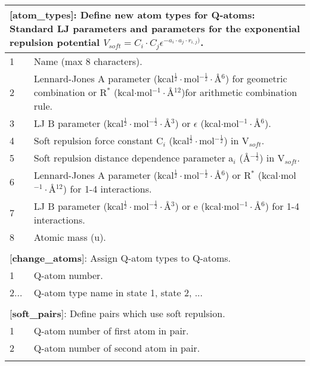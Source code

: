 \documentclass[a4paper,11pt]{article}
\begin{document}
\begin{longtable}{|p{53pt}|p{181pt}|p{160pt}|}
\multicolumn{3}{p{394pt}}{[\textbf{atom\_types}]: Define new atom types for Q-atoms: Standard LJ parameters and parameters for the exponential repulsion potential $V_{soft} = C_i\cdot C_j\epsilon^{-a_i\cdot a_j\cdot r_{i,j})}$.}\\
\hline 1 & \multicolumn{2}{p{341pt}|}{Name (max 8 characters).}\\
\hline 2 & \multicolumn{2}{p{341pt}|}{Lennard-Jones A parameter (kcal$^{\frac{1}{2}}\cdot$mol$^{-\frac{1}{2}}\cdot${\AA}$^{6}$) for geometric combination or R$^*$ (kcal$\cdot$mol$^{-1}\cdot${\AA}$^{12}$)for arithmetic combination rule.}\\
\hline 3 & \multicolumn{2}{p{341pt}|}{LJ B parameter (kcal$^{\frac{1}{2}}\cdot$mol$^{-\frac{1}{2}}\cdot${\AA}$^{3}$) or $\epsilon$ (kcal$\cdot$mol$^{-1}\cdot${\AA}$^{6}$).}\\
\hline 4 & \multicolumn{2}{p{341pt}|}{Soft repulsion force constant C$_i$ (kcal$^{\frac{1}{2}}\cdot$mol$^{-\frac{1}{2}}$) in V$_{soft}$.}\\
\hline 5 & \multicolumn{2}{p{341pt}|}{Soft repulsion distance dependence parameter a$_i$ ({\AA}$^{-\frac{1}{2}}$) in V$_{soft}$.}\\
\hline 6 & \multicolumn{2}{p{341pt}|}{Lennard-Jones A parameter (kcal$^{\frac{1}{2}}\cdot$mol$^{-\frac{1}{2}}\cdot${\AA}$^{6}$) or R$^*$ (kcal$\cdot$mol$^{-1}\cdot${\AA}$^{12}$) for 1-4 interactions.}\\
\hline 7 & \multicolumn{2}{p{341pt}|}{LJ B parameter (kcal$^{\frac{1}{2}}\cdot$mol$^{-\frac{1}{2}}\cdot${\AA}$^{3}$) or e (kcal$\cdot$mol$^{-1}\cdot${\AA}$^{6}$) for 1-4 interactions.}\\
\hline 8 & \multicolumn{2}{p{341pt}|}{Atomic mass (u).}\\
\hline
\multicolumn{3}{p{394pt}}{}\\

\multicolumn{3}{p{394pt}}{[\textbf{change\_atoms}]: Assign Q-atom types to Q-atoms.}\\
\hline 1 & \multicolumn{2}{p{341pt}|}{Q-atom number.}\\
\hline 2... & \multicolumn{2}{p{341pt}|}{Q-atom type name in state 1, state 2, ...}\\
\hline
\multicolumn{3}{p{394pt}}{}\\

\multicolumn{3}{p{394pt}}{[\textbf{soft\_pairs}]: Define pairs which use soft repulsion.}\\
\hline 1 & \multicolumn{2}{p{341pt}|}{Q-atom number of first atom in pair.}\\
\hline 2 & \multicolumn{2}{p{341pt}|}{Q-atom number of second atom in pair.}\\
\hline
\multicolumn{3}{p{394pt}}{}\\


\end{longtable}
\end{document}
